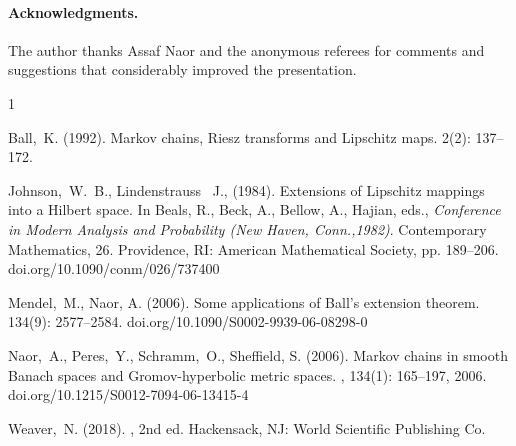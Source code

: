 \documentclass{amsart}
\begin{document}
\medskip 

\paragraph{Acknowledgments.}
    The author thanks  Assaf Naor and the anonymous referees for comments and suggestions that considerably improved the presentation. 


%
%

\def\polhk#1{\setbox0=\hbox{#1}{\ooalign{\hidewidth
            \lower1.5ex\hbox{`}\hidewidth\crcr\unhbox0}}}
\begin{thebibliography}{1}
    
    Ball,~K. (1992).
    \newblock Markov chains, {R}iesz transforms and {L}ipschitz maps.
     2(2): 137--172.
    
    Johnson,~W.~B.,  Lindenstrauss~ J., (1984).
    \newblock Extensions of {L}ipschitz mappings into a {H}ilbert space.
    \newblock In Beals, R., Beck, A., Bellow, A., Hajian, eds., {\em Conference in Modern Analysis and Probability ({N}ew {H}aven,
        {C}onn.,1982)}. Contemporary Mathematics, 26. Providence, RI: American Mathematical Society, pp. 189--206.
    \newblock 
    {doi.org/10.1090/conm/026/737400}
    
    Mendel,~M., Naor, A. (2006).
    \newblock Some applications of {B}all's extension theorem.
     134(9): 2577--2584.
    {doi.org/10.1090/S0002-9939-06-08298-0}
    
    Naor,~A., Peres,~Y., Schramm,~O., Sheffield, S. (2006).
    \newblock Markov chains in smooth {B}anach spaces and {G}romov-hyperbolic
    metric spaces.
    , 134(1): 165--197, 2006.
    \newblock 
    {doi.org/10.1215/S0012-7094-06-13415-4}
    
    Weaver,~N. (2018).
    , 2nd ed. Hackensack, NJ: 
    \newblock World Scientific Publishing Co. 
    
\end{thebibliography}
    
\end{document}
